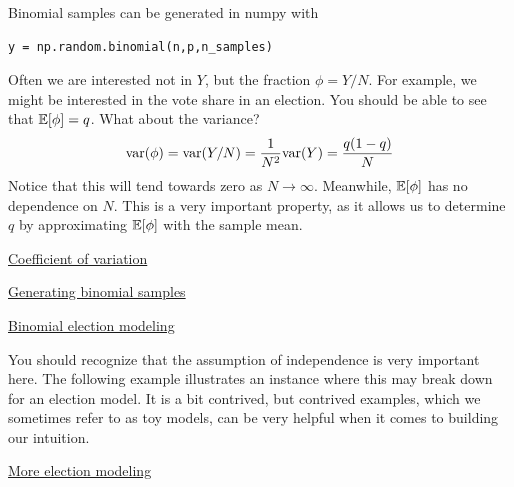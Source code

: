  
 Binomial samples can be generated in numpy with
 \begin{Verbatim}
y = np.random.binomial(n,p,n_samples)
 \end{Verbatim}
 
 Often we are interested not in $Y$, but the fraction $\phi = Y/N$. For example, we might be interested in the vote share in an election. You should be able to see that $\mathbb E[\phi] = q$. What about the variance? 
 \begin{equation}
{\rm var}(\phi) = {\rm var}(Y/N) = \frac{1}{N^2}{\rm var}(Y) = \frac{q(1-q)}{N}
 \end{equation}
 Notice that this will tend towards zero as $N \to \infty$. Meanwhile, $\mathbb E[\phi]$ has no dependence on $N$. This is a very important property, as it allows us to determine $q$ by approximating $\mathbb E[\phi]$ with the sample mean.
   
  \begin{example}
\href{https://colab.research.google.com/drive/1PPFwE4GUzsr707s3mPhGRs7-TYlHxND2#scrollTo=oaFLfi0JI4in&line=1&uniqifier=1}{Coefficient of variation}
\end{example}


 \begin{exercise}
\href{https://colab.research.google.com/drive/1PPFwE4GUzsr707s3mPhGRs7-TYlHxND2#scrollTo=vAmv5zV7gfE0}{Generating binomial samples}
\end{exercise}

\begin{exercise}
\href{https://colab.research.google.com/drive/1PPFwE4GUzsr707s3mPhGRs7-TYlHxND2#scrollTo=8cRVZNYtLOum}{Binomial election modeling}
\end{exercise}

You should recognize that the assumption of independence is very important here. The following example illustrates an instance where this may break down for an election model. It is a bit contrived, but contrived examples, which we sometimes refer to as {\dfn toy models}, can be very helpful when it comes to building our intuition. 
\begin{exercise}
\href{https://colab.research.google.com/drive/1PPFwE4GUzsr707s3mPhGRs7-TYlHxND2#scrollTo=cwE2yj2nqdYF&line=1&uniqifier=1}{More election modeling}
\end{exercise}

 

 
 
